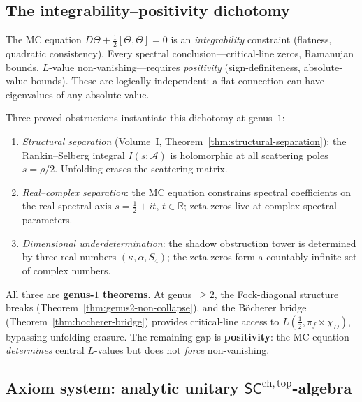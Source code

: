 \documentclass[11pt]{article}
\newcommand{\cA}{\mathcal{A}}
\newcommand{\SCchtop}{\mathsf{SC}^{\mathrm{ch,top}}}
\providecommand{\bR}{\mathbb{R}}
\begin{document}
\subsection{The integrability--positivity dichotomy}
\label{sec:integrability-positivity}

The MC equation $D\Theta + \tfrac{1}{2}[\Theta,\Theta] = 0$ is
an \emph{integrability} constraint (flatness, quadratic
consistency).  Every spectral conclusion---critical-line zeros,
Ramanujan bounds, $L$-value non-vanishing---requires
\emph{positivity} (sign-definiteness, absolute-value bounds).
These are logically independent: a flat connection can have
eigenvalues of any absolute value.

Three proved obstructions instantiate this dichotomy at genus~$1$:
\begin{enumerate}[label=\textup{(\roman*)}]
\item \emph{Structural separation}
  \textup{(}Volume~I,
  Theorem~\ref*{thm:structural-separation}\textup{)}: the
  Rankin--Selberg integral $I(s;\cA)$ is holomorphic at all
  scattering poles $s = \rho/2$.  Unfolding erases the
  scattering matrix.
\item \emph{Real--complex separation}: the MC equation constrains
  spectral coefficients on the real spectral axis
  $s = \tfrac{1}{2} + it$, $t \in \bR$; zeta zeros live at
  complex spectral parameters.
\item \emph{Dimensional underdetermination}: the shadow
  obstruction tower is determined by three real numbers
  $(\kappa, \alpha, S_4)$; the zeta zeros form a countably
  infinite set of complex numbers.
\end{enumerate}
All three are \textbf{genus-$1$ theorems}.  At genus~$\geq 2$,
the Fock-diagonal structure breaks
(Theorem~\ref*{thm:genus2-non-collapse}), and the
B\"ocherer bridge
(Theorem~\ref*{thm:bocherer-bridge})
provides critical-line access to $L(\tfrac{1}{2},
\pi_f \times \chi_D)$, bypassing unfolding erasure.
The remaining gap is \textbf{positivity}: the MC equation
\emph{determines} central $L$-values but does not
\emph{force} non-vanishing.

\subsection{Axiom system: analytic unitary
  $\SCchtop$-algebra}
\label{sec:analytic-axioms}
\end{document}
